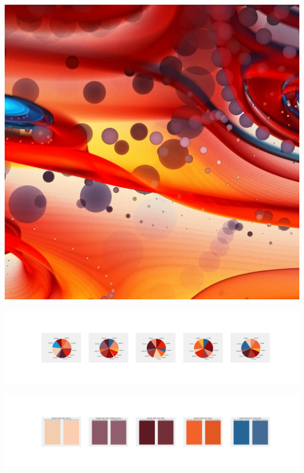 \documentclass[11pt]{article}
\begin{document}
\begin{landscape}
    \begin{center}
    \includegraphics[width=\textwidth]{./nbimg/file (123).jpg}
    \end{center}

    \begin{center}
    \includegraphics[width=250mm]{./nbimg/pie-27.jpg}
    \end{center}

    \begin{center}
    \includegraphics[width=250mm]{./nbimg/peak-27.jpg}
    \end{center}
    


\end{landscape}
\end{document}
